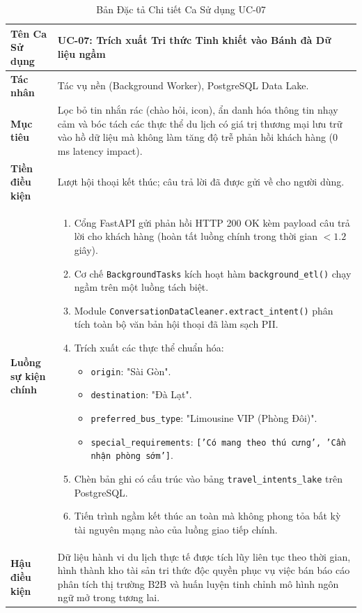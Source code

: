\begin{table}[h!]
\centering
\small
\begin{tabular}{|p{3.2cm}|p{11.5cm}|}
\hline
\textbf{Tên Ca Sử dụng} & \textbf{UC-07: Trích xuất Tri thức Tinh khiết vào Bánh đà Dữ liệu ngầm} \\
\hline
\textbf{Tác nhân} & Tác vụ nền (Background Worker), PostgreSQL Data Lake. \\
\hline
\textbf{Mục tiêu} & Lọc bỏ tin nhắn rác (chào hỏi, icon), ẩn danh hóa thông tin nhạy cảm và bóc tách các thực thể du lịch có giá trị thương mại lưu trữ vào hồ dữ liệu mà không làm tăng độ trễ phản hồi khách hàng ($0$ ms latency impact). \\
\hline
\textbf{Tiền điều kiện} & Lượt hội thoại kết thúc; câu trả lời đã được gửi về cho người dùng. \\
\hline
\textbf{Luồng sự kiện chính} & 
\begin{enumerate}
    \item Cổng FastAPI gửi phản hồi HTTP 200 OK kèm payload câu trả lời cho khách hàng (hoàn tất luồng chính trong thời gian $< 1.2$ giây).
    \item Cơ chế \texttt{BackgroundTasks} kích hoạt hàm \texttt{background\_etl()} chạy ngầm trên một luồng tách biệt.
    \item Module \texttt{ConversationDataCleaner.extract\_intent()} phân tích toàn bộ văn bản hội thoại đã làm sạch PII.
    \item Trích xuất các thực thể chuẩn hóa:
    \begin{itemize}
        \item \texttt{origin}: "Sài Gòn".
        \item \texttt{destination}: "Đà Lạt".
        \item \texttt{preferred\_bus\_type}: "Limousine VIP (Phòng Đôi)".
        \item \texttt{special\_requirements}: \texttt{['Có mang theo thú cưng', 'Cần nhận phòng sớm']}.
    \end{itemize}
    \item Chèn bản ghi có cấu trúc vào bảng \texttt{travel\_intents\_lake} trên PostgreSQL.
    \item Tiến trình ngầm kết thúc an toàn mà không phong tỏa bất kỳ tài nguyên mạng nào của luồng giao tiếp chính.
\end{enumerate} \\
\hline
\textbf{Hậu điều kiện} & Dữ liệu hành vi du lịch thực tế được tích lũy liên tục theo thời gian, hình thành kho tài sản tri thức độc quyền phục vụ việc bán báo cáo phân tích thị trường B2B và huấn luyện tinh chỉnh mô hình ngôn ngữ mở trong tương lai. \\
\hline
\end{tabular}
\caption{Bản Đặc tả Chi tiết Ca Sử dụng UC-07}
\label{tab:spec_uc07}
\end{table}
